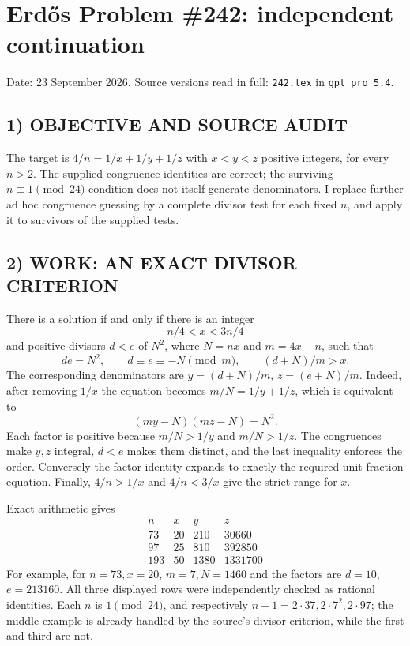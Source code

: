\section{Erd\H{o}s Problem \#242: independent continuation}
\noindent Date: 23 September 2026. Source versions read in full: \texttt{242.tex} in \texttt{gpt\_pro\_5.4}.

\subsection*{1) OBJECTIVE AND SOURCE AUDIT}
The target is $4/n=1/x+1/y+1/z$ with $x<y<z$ positive integers, for every
$n>2$. The supplied congruence identities are correct; the surviving
$n\equiv1\pmod{24}$ condition does not itself generate denominators.
I replace further ad hoc congruence guessing by a complete divisor test
for each fixed $n$, and apply it to survivors of the supplied tests.

\subsection*{2) WORK: AN EXACT DIVISOR CRITERION}
There is a solution if and only if there is an integer
\[
 n/4<x<3n/4
\]
and positive divisors $d<e$ of $N^2$, where $N=nx$ and $m=4x-n$, such that
\[
 de=N^2,\qquad d\equiv e\equiv-N\pmod m,\qquad (d+N)/m>x.
\]
The corresponding denominators are $y=(d+N)/m$, $z=(e+N)/m$.
Indeed, after removing $1/x$ the equation becomes
$m/N=1/y+1/z$, which is equivalent to
\[
 (my-N)(mz-N)=N^2.
\]
Each factor is positive because $m/N>1/y$ and $m/N>1/z$.
The congruences make $y,z$ integral, $d<e$ makes them distinct, and the
last inequality enforces the order. Conversely the factor identity
expands to exactly the required unit-fraction equation.
Finally, $4/n>1/x$ and $4/n<3/x$ give the strict range for $x$.

Exact arithmetic gives
\[
\begin{array}{c|ccc}
n&x&y&z\\\hline
73&20&210&30660\\
97&25&810&392850\\
193&50&1380&1331700
\end{array}
\]
For example, for $n=73,x=20$, $m=7,N=1460$ and the factors are
$d=10$, $e=213160$. All three displayed rows were independently checked
as rational identities. Each $n$ is $1\pmod{24}$, and respectively
$n+1=2\cdot37,2\cdot7^2,2\cdot97$; the middle example is already handled
by the source's divisor criterion, while the first and third are not.

